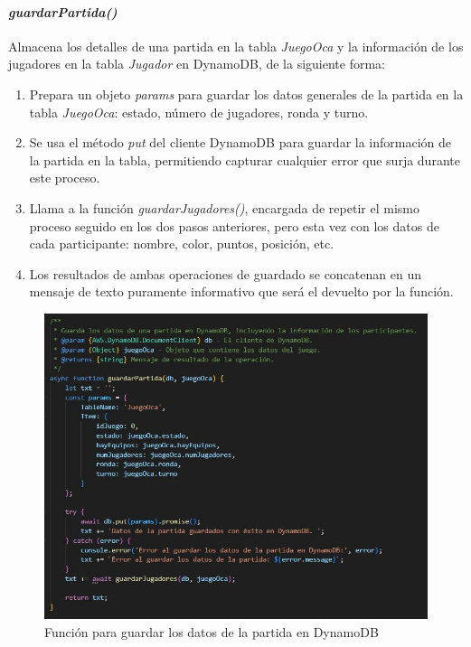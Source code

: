 \paragraph{\textit{guardarPartida()}}

Almacena los detalles de una partida en la tabla \textit{JuegoOca} y la información de los jugadores en la tabla \textit{Jugador} en DynamoDB, de la siguiente forma:
\begin{enumerate}
	\item Prepara un objeto \textit{params} para guardar los datos generales de la partida en la tabla \textit{JuegoOca}: estado, número de jugadores, ronda y turno. 
	\item Se usa el método \textit{put} del cliente DynamoDB para guardar la información de la partida en la tabla, permitiendo capturar cualquier error que surja durante este proceso.
	\item Llama a la función \textit{guardarJugadores()}, encargada de repetir el mismo proceso seguido en los dos pasos anteriores, pero esta vez con los datos de cada participante: nombre, color, puntos, posición, etc.
	\item Los resultados de ambas operaciones de guardado se concatenan en un mensaje de texto puramente informativo que será el devuelto por la función.
\end{enumerate}

\begin{figure}[H]
	\centering
	\includegraphics{imgs/codigo-db-2.jpg}
	\caption{Función para guardar los datos de la partida en DynamoDB}
	\label{fig:codigo-db-2}
\end{figure}

